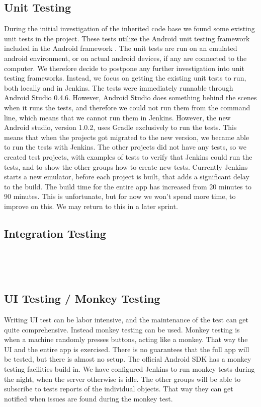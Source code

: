 \subsection{Unit Testing}
During the initial investigation of the inherited code base we found some existing unit tests in the  project. These tests utilize the Android unit testing framework included in the Android framework \parencite{AndroidUnit}. The unit tests are run on an emulated android environment, or on actual android devices, if any are connected to the computer. We therefore decide to postpone any further investigation into unit testing frameworks. Instead, we focus on getting the existing unit tests to run, both locally and in Jenkins. The tests were immediately runnable through Android Studio 0.4.6. However, Android Studio does something behind the scenes when it runs the tests, and therefore we could not run them from the command line, which means that we cannot run them in Jenkins. However, the new Android studio, version 1.0.2, uses Gradle exclusively to run the tests. This means that when the projects got migrated to the new version, we became able to run the tests with Jenkins.
The other projects did not have any tests, so we created test projects, with examples of tests to verify that Jenkins could run the tests, and to show the other groups how to create new tests.
Currently Jenkins starts a new emulator, before each project is built, that adds a significant delay to the build. The build time for the entire app has increased from 20 minutes to 90 minutes. This is unfortunate, but for now we won't spend more time, to improve on this. We may return to this in a later sprint.
\subsection{Integration Testing}
\dummy~\dummy~\dummy

\dummy~\dummy~\dummy~
\subsection{UI Testing / Monkey Testing}
Writing UI test can be labor intensive, and the maintenance of the test can get quite comprehensive. Instead monkey testing can be used. Monkey testing is when a machine randomly presses buttons, acting like a monkey. That way the UI and the entire app is exercised. There is no guarantees that the full app will be tested, but there is almost no setup. The official Android SDK has a monkey testing facilities build in. We have configured Jenkins to run monkey tests during the night, when the server otherwise is idle. The other groups will be able to subscribe to tests reports of the individual objects. That way they can get notified when issues are found during the monkey test.
